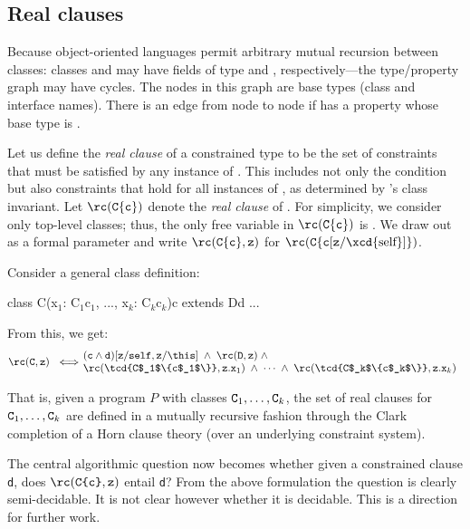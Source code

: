\subsection{Real clauses}

Because object-oriented languages permit arbitrary mutual recursion between
classes: classes  and  may have fields of type  and
, respectively---the type/property graph may have cycles. The nodes
in this graph are base types (class and interface names). There is an
edge from node  to node  if  has a property whose
base type is .

Let us define the {\em real clause} of a constrained type
 to be
the set of constraints that must be satisfied by any instance of
. This includes not only the condition  but also
constraints that hold for all instances of , as
determined by 's class invariant. Let 
$\rc({\tt C\{c\}})$ denote the {\em real clause} of .
For simplicity, we consider only top-level classes; thus, the
only free variable
in $\rc({\tt C\{c\}})$ is .  We draw out  as a
formal parameter and write $\rc({\tt C\{c\}}, {\tt z})$
for $\rc({\tt C\{c}[{\tt z}/\mbox{\xcd{self}}]\})$.

Consider a general class definition:
\begin{xten}
class C(x$_1$: C$_1${c$_1$}, ..., x$_k$: C$_k${c$_k$}){c}
  extends D{d} { ... }
\end{xten}

\noindent From this, we get:
%
$$\rc({\tt C},{\tt z}) ~ \iff \!\!\!\!\!\!\!\!\!\!
\begin{array}{l}
\quad  ({\tt c} \wedge {\tt d})[{\tt z}/{\tt self},{\tt z}/\this]
\;\wedge\; \rc({\tt D},{\tt z}) \;\wedge \\
\quad  \rc(\mbox{\tcd{C$_1$\{c$_1$\}}}, {\tt z.x}_1) \;\wedge\; \cdots
\;\wedge\; \rc(\mbox{\tcd{C$_k$\{c$_k$\}}}, {\tt z.x}_k)
\end{array}
$$

That is, given a program $P$ with classes ${\tt C}_1,\ldots, {\tt
C}_k$, the set of real clauses for ${\tt C}_1,\ldots, {\tt C}_k$ are
defined in a mutually recursive fashion through the Clark completion
of a Horn clause theory (over an underlying constraint system).

The central algorithmic question now becomes whether given a
constrained clause {\tt d}, does $\rc(\mbox{\tt C\{c\}},{\tt z})$ entail {\tt d}? 
%
From the above formulation the question is clearly semi-decidable. It
is not clear however whether it is decidable. This is a direction for
further work.

